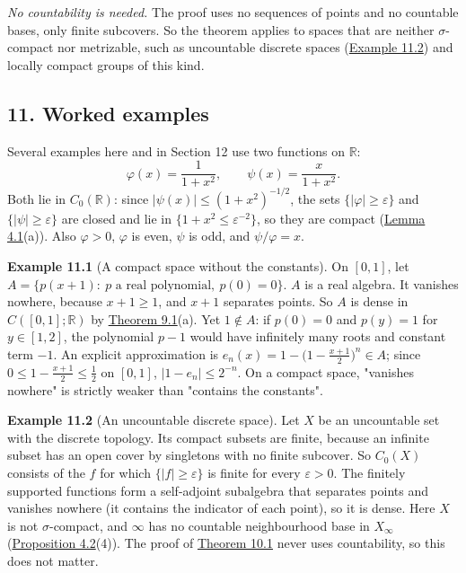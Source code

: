 \documentclass[
  english,
  11pt,
  a4paper,
]{article}
\begin{document}
\emph{No countability is needed.} The proof uses no sequences of points
and no countable bases, only finite subcovers. So the theorem applies to
spaces that are neither \(\sigma\)-compact nor metrizable, such as
uncountable discrete spaces
(\hyperlink{the-stone-weierstrass-theorem-for-functions-vanishing-at-infinity--oa-fnd-sw-13}{Example
11.2}) and locally compact groups of this kind.

\subsection[11. Worked
examples]{\texorpdfstring{\protect\hypertarget{the-stone-weierstrass-theorem-for-functions-vanishing-at-infinity--oa-fnd-sw-13}{}{}11.
Worked
examples}{11. Worked examples}}\label{the-stone-weierstrass-theorem-for-functions-vanishing-at-infinity--OA-FND-SW-13}

Several examples here and in Section 12 use two functions on
\(\mathbb R\):
\[\varphi(x)=\frac1{1+x^2},\qquad\psi(x)=\frac{x}{1+x^2}.\] Both lie in
\(C_0(\mathbb R)\): since \(|\psi(x)|\leq(1+x^2)^{-1/2}\), the sets
\(\{|\varphi|\geq\varepsilon\}\) and \(\{|\psi|\geq\varepsilon\}\) are
closed and lie in \(\{1+x^2\leq\varepsilon^{-2}\}\), so they are compact
(\hyperlink{the-stone-weierstrass-theorem-for-functions-vanishing-at-infinity--oa-fnd-sw-15}{Lemma
4.1}(a)). Also \(\varphi>0\), \(\varphi\) is even, \(\psi\) is odd, and
\(\psi/\varphi=x\).

\textbf{Example 11.1} (A compact space without the constants). On
\([0,1]\), let \(A=\{p(x+1):\ p\text{ a real polynomial},\ p(0)=0\}\).
\(A\) is a real algebra. It vanishes nowhere, because \(x+1\geq1\), and
\(x+1\) separates points. So \(A\) is dense in \(C([0,1];\mathbb R)\) by
\hyperlink{the-stone-weierstrass-theorem-for-functions-vanishing-at-infinity--oa-fnd-sw-07}{Theorem
9.1}(a). Yet \(1\notin A\): if \(p(0)=0\) and \(p(y)=1\) for
\(y\in[1,2]\), the polynomial \(p-1\) would have infinitely many roots
and constant term \(-1\). An explicit approximation is
\(e_n(x)=1-\bigl(1-\frac{x+1}2\bigr)^n\in A\); since
\(0\leq1-\frac{x+1}2\leq\frac12\) on \([0,1]\), \(|1-e_n|\leq2^{-n}\).
On a compact space, "vanishes nowhere" is strictly weaker than "contains
the constants".

\textbf{Example 11.2} (An uncountable discrete space). Let \(X\) be an
uncountable set with the discrete topology. Its compact subsets are
finite, because an infinite subset has an open cover by singletons with
no finite subcover. So \(C_0(X)\) consists of the \(f\) for which
\(\{|f|\geq\varepsilon\}\) is finite for every \(\varepsilon>0\). The
finitely supported functions form a self-adjoint subalgebra that
separates points and vanishes nowhere (it contains the indicator of each
point), so it is dense. Here \(X\) is not \(\sigma\)-compact, and
\(\infty\) has no countable neighbourhood base in \(X_\infty\)
(\hyperlink{the-stone-weierstrass-theorem-for-functions-vanishing-at-infinity--oa-fnd-sw-15}{Proposition
4.2}(4)). The proof of
\hyperlink{the-stone-weierstrass-theorem-for-functions-vanishing-at-infinity--oa-fnd-sw-09}{Theorem
10.1} never uses countability, so this does not matter.
\end{document}
